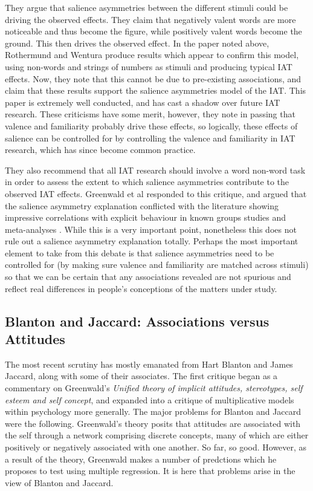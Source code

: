 They argue that salience asymmetries between the different stimuli could be driving the observed effects. They claim that negatively valent words are more noticeable and thus become the figure, while positively valent words become the ground. This then drives the observed  effect. In the paper noted above, Rothermund and Wentura produce results which appear to confirm this model, using non-words and strings of numbers as stimuli and producing typical IAT effects. Now, they note that this cannot be due to pre-existing associations, and claim that these results support the salience asymmetries model of the IAT. This paper is extremely well conducted, and has  cast a shadow over future IAT research. These criticisms have some merit, however, they note in passing that valence and familiarity probably drive these effects, so logically, these effects of salience can be controlled for by controlling the valence and familiarity in IAT research, which has since become common practice. 

They also recommend that all IAT research should involve a word non-word task in order to assess the extent to which salience asymmetries contribute to the observed IAT effects. Greenwald  et al \cite{Greenwald2005} responded to this critique, and argued that the salience asymmetry explanation conflicted with the literature showing impressive correlations with explicit behaviour in known groups studies and meta-analyses \cite{Greenwald2009}. While this is a very important point, nonetheless this does not rule out a salience asymmetry explanation totally. Perhaps the most important element to take from this debate is that salience asymmetries need to be controlled for (by making sure valence and familiarity are matched across stimuli) so that we can be certain that any associations revealed are not spurious and reflect real differences in people's conceptions of the matters under study. 

\subsection{Blanton and Jaccard: Associations versus Attitudes}


The most recent scrutiny has mostly emanated from Hart Blanton and James Jaccard, along with some of their associates. The first critique began as a commentary on Greenwald's \cite{greenwald2002}  \textit{Unified theory of implicit attitudes, stereotypes, self esteem and self concept}, and expanded into a critique of multiplicative models within psychology more generally. The major problems for Blanton and Jaccard \cite{Blanton2006a} were the following. Greenwald's theory posits that attitudes are associated with the self through a network comprising discrete concepts, many of which are either positively or negatively associated with one another. So far, so good. However, as a result of the theory, Greenwald makes a number of predctions which he proposes to test using multiple regression. It is here that problems arise in the view of Blanton and Jaccard. 


